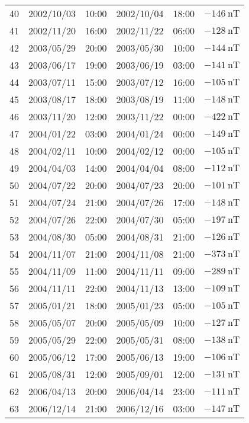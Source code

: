 \begin{table}[ht]
\begin{adjustbox}{width=\textwidth,totalheight=0.9\textheight,keepaspectratio}
\begin{tabular}{cccccc}
    40 & 2002/10/03 & 10:00 & 2002/10/04 & 18:00 & $ \SI{-146}{\nano\tesla}$ \\
    41 & 2002/11/20 & 16:00 & 2002/11/22 & 06:00 & $ \SI{-128}{\nano\tesla}$ \\
    42 & 2003/05/29 & 20:00 & 2003/05/30 & 10:00 & $ \SI{-144}{\nano\tesla}$ \\
    43 & 2003/06/17 & 19:00 & 2003/06/19 & 03:00 & $ \SI{-141}{\nano\tesla}$ \\
    44 & 2003/07/11 & 15:00 & 2003/07/12 & 16:00 & $ \SI{-105}{\nano\tesla}$ \\
    45 & 2003/08/17 & 18:00 & 2003/08/19 & 11:00 & $ \SI{-148}{\nano\tesla}$ \\
    46 & 2003/11/20 & 12:00 & 2003/11/22 & 00:00 & $ \SI{-422}{\nano\tesla}$ \\
    47 & 2004/01/22 & 03:00 & 2004/01/24 & 00:00 & $ \SI{-149}{\nano\tesla}$ \\
    48 & 2004/02/11 & 10:00 & 2004/02/12 & 00:00 & $ \SI{-105}{\nano\tesla}$ \\
    49 & 2004/04/03 & 14:00 & 2004/04/04 & 08:00 & $ \SI{-112}{\nano\tesla}$ \\
    50 & 2004/07/22 & 20:00 & 2004/07/23 & 20:00 & $ \SI{-101}{\nano\tesla}$ \\
    51 & 2004/07/24 & 21:00 & 2004/07/26 & 17:00 & $ \SI{-148}{\nano\tesla}$ \\
    52 & 2004/07/26 & 22:00 & 2004/07/30 & 05:00 & $ \SI{-197}{\nano\tesla}$ \\
    53 & 2004/08/30 & 05:00 & 2004/08/31 & 21:00 & $ \SI{-126}{\nano\tesla}$ \\
    54 & 2004/11/07 & 21:00 & 2004/11/08 & 21:00 & $ \SI{-373}{\nano\tesla}$ \\
    55 & 2004/11/09 & 11:00 & 2004/11/11 & 09:00 & $ \SI{-289}{\nano\tesla}$ \\
    56 & 2004/11/11 & 22:00 & 2004/11/13 & 13:00 & $ \SI{-109}{\nano\tesla}$ \\
    57 & 2005/01/21 & 18:00 & 2005/01/23 & 05:00 & $ \SI{-105}{\nano\tesla}$ \\
    58 & 2005/05/07 & 20:00 & 2005/05/09 & 10:00 & $ \SI{-127}{\nano\tesla}$ \\
    59 & 2005/05/29 & 22:00 & 2005/05/31 & 08:00 & $ \SI{-138}{\nano\tesla}$ \\
    60 & 2005/06/12 & 17:00 & 2005/06/13 & 19:00 & $ \SI{-106}{\nano\tesla}$ \\
    61 & 2005/08/31 & 12:00 & 2005/09/01 & 12:00 & $ \SI{-131}{\nano\tesla}$ \\
    62 & 2006/04/13 & 20:00 & 2006/04/14 & 23:00 & $ \SI{-111}{\nano\tesla}$ \\
    63 & 2006/12/14 & 21:00 & 2006/12/16 & 03:00 & $ \SI{-147}{\nano\tesla}$ \\ \hline
    \end{tabular}%
    \end{adjustbox}
    \end{table}
    

%
%
